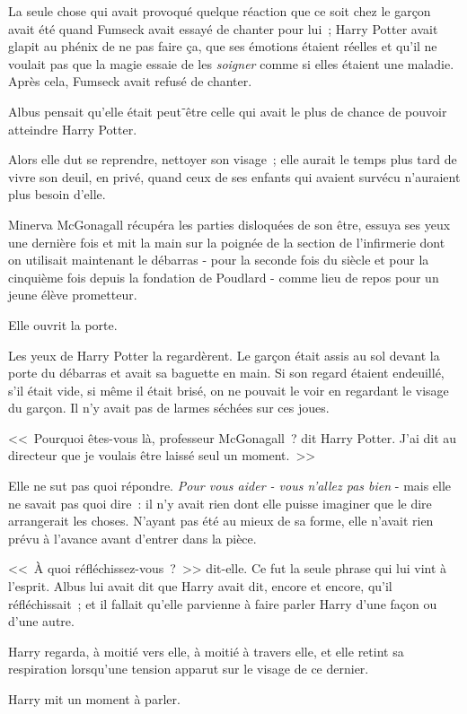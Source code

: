 La seule chose qui avait provoqué quelque réaction que ce soit chez le garçon avait été quand Fumseck avait essayé de chanter pour lui~; Harry Potter avait glapit au phénix de ne pas faire ça, que ses émotions étaient réelles et qu'il ne voulait pas que la magie essaie de les \emph{soigner} comme si elles étaient une maladie. Après cela, Fumseck avait refusé de chanter.

Albus pensait qu'elle était peut⁻être celle qui avait le plus de chance de pouvoir atteindre Harry Potter.

Alors elle dut se reprendre, nettoyer son visage~; elle aurait le temps plus tard de vivre son deuil, en privé, quand ceux de ses enfants qui avaient survécu n'auraient plus besoin d'elle.

Minerva McGonagall récupéra les parties disloquées de son être, essuya ses yeux une dernière fois et mit la main sur la poignée de la section de l'infirmerie dont on utilisait maintenant le débarras - pour la seconde fois du siècle et pour la cinquième fois depuis la fondation de Poudlard - comme lieu de repos pour un jeune élève prometteur.

Elle ouvrit la porte.

Les yeux de Harry Potter la regardèrent. Le garçon était assis au sol devant la porte du débarras et avait sa baguette en main. Si son regard étaient endeuillé, s'il était vide, si même il était brisé, on ne pouvait le voir en regardant le visage du garçon. Il n'y avait pas de larmes séchées sur ces joues.

<<~Pourquoi êtes-vous là, professeur McGonagall~? dit Harry Potter. J'ai dit au directeur que je voulais être laissé seul un moment.~>>

Elle ne sut pas quoi répondre. \emph{Pour vous aider - vous n'allez pas bien} - mais elle ne savait pas quoi dire~: il n'y avait rien dont elle puisse imaginer que le dire arrangerait les choses. N'ayant pas été au mieux de sa forme, elle n'avait rien prévu à l'avance avant d'entrer dans la pièce.

<<~À quoi réfléchissez-vous~?~>> dit-elle. Ce fut la seule phrase qui lui vint à l'esprit. Albus lui avait dit que Harry avait dit, encore et encore, qu'il réfléchissait~; et il fallait qu'elle parvienne à faire parler Harry d'une façon ou d'une autre.

Harry regarda, à moitié vers elle, à moitié à travers elle, et elle retint sa respiration lorsqu'une tension apparut sur le visage de ce dernier.

Harry mit un moment à parler.

